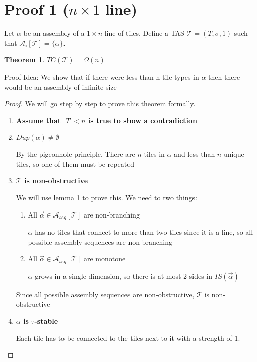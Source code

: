 \documentclass[12pt]{article}
\newtheorem{theorem}{Theorem}
\newcommand{\tTerm}{\mathcal{A}_\square[\mathcal{T}]}
\newcommand{\tSeq}{\mathcal{A}_{seq}[\mathcal{T}]}
\newcommand{\aSeq}{\overrightarrow{\alpha}}
\begin{document}
\section*{Proof 1 ($n \times 1 $ line)}

Let $\alpha$ be an assembly of a $1 \times n$ line of tiles. Define a TAS $\mathcal{T} = (T, \sigma, 1)$ such that $\tTerm = \{ \alpha \}$. 

\begin{theorem}
	$TC(\mathcal{T}) = \Omega(n)$
\end{theorem}

Proof Idea:  We show that if there were less than n tile types in $\alpha$ then there would be an assembly of infinite size

\begin{proof}
	We will go step by step to prove this theorem formally.

	\begin{enumerate}
		\item \textbf{Assume that $|T| < n$ is true to show a contradiction}

		\item \textbf{$Dup(\alpha) \neq \emptyset$}

		By the pigeonhole principle. There are $n$ tiles in $\alpha$ and less than $n$ unique tiles, so one of them must be repeated

    \item \textbf{$\mathcal{T}$ is non-obstructive}

        We will use lemma 1 to prove this. We need to two things:
        \begin{enumerate}
            \item All $\aSeq \in \tSeq$ are non-branching

                $\alpha$ has no tiles that connect to more than two tiles since it is a line, so all possible assembly sequences are non-branching
            \item All $\aSeq \in \tSeq$ are monotone

                $\alpha$ grows in a single dimension, so there is at most 2 sides in $IS(\aSeq)$
        \end{enumerate}
        Since all possible assembly sequences are non-obstructive, $\mathcal{T}$ is non-obstructive

        \item \textbf{$\alpha$ is $\tau$-stable}

            Each tile has to be connected to the tiles next to it with a strength of 1. 



\end{enumerate}
\end{proof}
\end{document}
